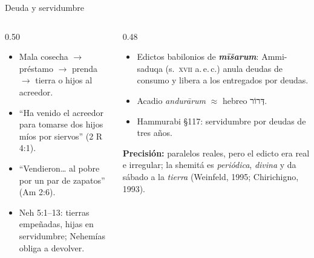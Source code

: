 \documentclass[hyperref={bookmarks=false},aspectratio=169]{beamer}
\newcommand{\heb}[1]{\mbox{\foreignlanguage{hebrew}{#1}}}
\newcommand{\destacar}[1]{\textbf{\textcolor{tierraroja}{#1}}}
\newcommand{\precision}[1]{{\footnotesize\color{sepia}\textbf{Precisión:} #1}}
\begin{document}
\begin{frame}{Deuda y servidumbre}
\begin{columns}[t,onlytextwidth]
\begin{column}{0.50\textwidth}\small
\begin{itemize}
\item Mala cosecha $\rightarrow$ préstamo $\rightarrow$ prenda $\rightarrow$ tierra o hijos al acreedor.
\item ``Ha venido el acreedor para tomarse dos hijos míos por siervos'' (2 R 4:1).
\item ``Vendieron\ldots{} al pobre por un par de zapatos'' (Am 2:6).
\item Neh 5:1--13: tierras empeñadas, hijas en servidumbre; Nehemías obliga a devolver.
\end{itemize}
\end{column}
\begin{column}{0.48\textwidth}\small
\begin{itemize}
\item Edictos babilonios de \destacar{\emph{mīšarum}}: Ammi-saduqa (s.~\textsc{xvii} a.\,e.\,c.) anula deudas de consumo y libera a los entregados por deudas.
\item Acadio \emph{andurārum} $\approx$ hebreo \heb{דְּרוֹר}.
\item Hammurabi §117: servidumbre por deudas de tres años.
\end{itemize}
\precision{paralelos reales, pero el edicto era real e irregular; la shemitá es \emph{periódica}, \emph{divina} y da sábado a la \emph{tierra} (Weinfeld, 1995; Chirichigno, 1993).}
\end{column}
\end{columns}
\end{frame}
\end{document}
